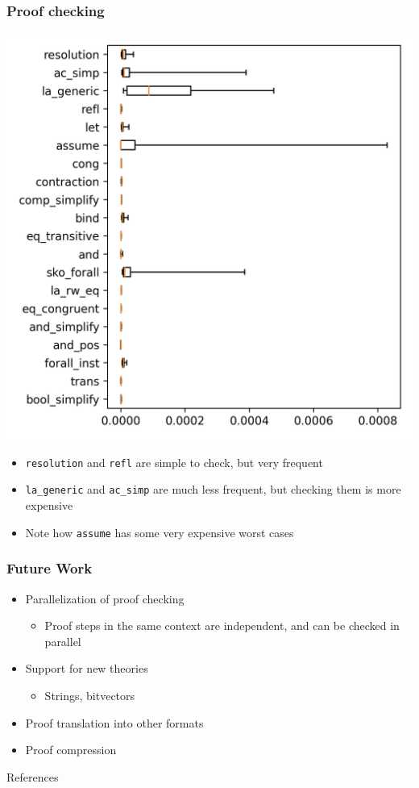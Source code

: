 \documentclass[usepdftitle=false,aspectratio=169]{beamer}
\newcommand\vitem{\vfill\item}
\begin{document}
\begin{frame}
  \frametitle{Proof checking}
  \begin{minipage}{0.64 \textwidth}
    \centering
    \includegraphics[height=0.9\textheight]{images/by-rules-boxplot.png}
  \end{minipage}
  \hfill
  \begin{minipage}[c][0.8 \textheight]{0.3 \textwidth}
    \begin{itemize}
      \item \texttt{resolution} and \texttt{refl} are simple to check, but very
      frequent
      \vitem \texttt{la\_generic} and \texttt{ac\_simp} are much less frequent,
      but checking them is more expensive
      \vitem Note how \texttt{assume} has some very expensive worst cases
      \vfill
    \end{itemize}
  \end{minipage}
\end{frame}

\begin{frame}
  \frametitle{Future Work}
  \begin{itemize}
    \item Parallelization of proof checking
    \begin{itemize}
      \item Proof steps in the same context are independent, and can be checked
      in parallel
    \end{itemize}
    \vitem Support for new theories
    \begin{itemize}
      \item Strings, bitvectors
    \end{itemize}
    \vitem Proof translation into other formats
    \vitem Proof compression
  \end{itemize}
\end{frame}

\begin{frame}{References}
\printbibliography
\end{frame}
\end{document}
